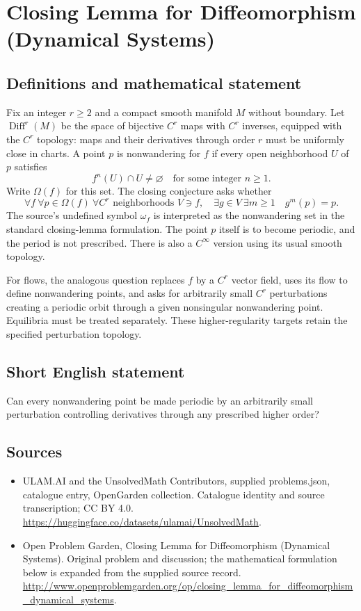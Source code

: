 \documentclass[11pt,a4paper]{article}
\begin{document}
\section*{Closing Lemma for Diffeomorphism (Dynamical Systems)}\label{statement}

\subsection{Definitions and mathematical statement}
Fix an integer $r\ge2$ and a compact smooth manifold $M$ without
boundary. Let $\operatorname{Diff}^r(M)$ be the space of bijective
$C^r$ maps with $C^r$ inverses, equipped with the $C^r$ topology:
maps and their derivatives through order $r$ must be uniformly
close in charts. A point $p$ is nonwandering for $f$ if every open
neighborhood $U$ of $p$ satisfies
\[
                       f^n(U)\cap U\ne\varnothing
                       \quad\text{for some integer }n\ge1.
\]
Write $\Omega(f)$ for this set. The closing conjecture asks whether
\[
 \forall f\ \forall p\in\Omega(f)\ \forall C^r\text{ neighborhoods }V\ni f,
 \quad\exists g\in V\ \exists m\ge1\quad g^m(p)=p.
\]
The source's undefined symbol $\omega_f$ is interpreted as the
nonwandering set in the standard closing-lemma formulation. The point
$p$ itself is to become periodic, and the period is not prescribed.
There is also a $C^\infty$ version using its usual smooth topology.

For flows, the analogous question replaces $f$ by a $C^r$ vector
field, uses its flow to define nonwandering points, and asks for
arbitrarily small $C^r$ perturbations creating a periodic orbit
through a given nonsingular nonwandering point. Equilibria must be
treated separately. These higher-regularity targets retain the
specified perturbation topology.
\subsection{Short English statement}
Can every nonwandering point be made periodic by an arbitrarily small perturbation controlling derivatives through any prescribed higher order?
\subsection{Sources}
\begin{itemize}
\item[S1] ULAM.AI and the UnsolvedMath Contributors, supplied problems.json, catalogue entry, OpenGarden collection. Catalogue identity and source transcription; CC BY 4.0.
\url{https://huggingface.co/datasets/ulamai/UnsolvedMath}.
\item[S2] Open Problem Garden, Closing Lemma for Diffeomorphism (Dynamical Systems). Original problem and discussion; the mathematical formulation below is expanded from the supplied source record.
\url{http://www.openproblemgarden.org/op/closing_lemma_for_diffeomorphism_dynamical_systems}.
\end{itemize}
\end{document}
